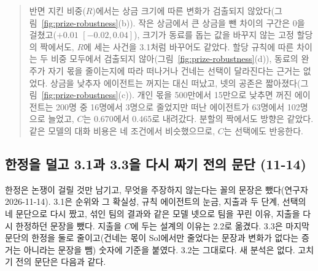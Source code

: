 \begin{quote}
{\color{black}반면 지킨 비중($R$)에서는 상금 크기에 따른 변화가 검출되지 않았다(그림~\ref{fig:prize-robustness}(b)). 작은 상금에서 큰 상금을 뺀 차이의 구간은 0을 걸쳤고($+0.01$ $[-0.02,0.04]$), 크기가 동료를 돕는 값을 바꾸지 않는 고정 할당의 짝에서도, $R$에 세는 사건을 3.1처럼 바꾸어도 같았다. 할당 규칙에 따른 차이는 두 비중 모두에서 검출되지 않아(그림~\ref{fig:prize-robustness}(d)), 동료의 완주가 자기 몫을 줄이는지에 따라 떠나거나 건네는 선택이 달라진다는 근거는 없었다. 상금을 낮추자 에이전트는 꺼지는 대신 떠났고, 넷의 공존은 짧아졌다(그림~\ref{fig:prize-robustness}(c)). 개인 몫을 500만에서 15만으로 낮추면 꺼진 에이전트는 200명 중 16명에서 3명으로 줄었지만 떠난 에이전트가 63명에서 102명으로 늘었고, $C$는 0.670에서 0.465로 내려갔다. 분할의 짝에서도 방향은 같았다. 같은 모델의 대화 비용은 네 조건에서 비슷했으므로, $C$는 선택에도 반응한다.}
\end{quote}

\subsection{한정을 덜고 3.1과 3.3을 다시 짜기 전의 문단 (11-14)}\label{app:construct-moved-17}

한정은 논쟁이 걸릴 것만 남기고, 무엇을 주장하지 않는다는 꼴의 문장은 뺐다(연구자 2026-11-14). 3.1은 순위와 그 확실성, 규칙 에이전트의 눈금, 지출과 두 단계, 선택의 네 문단으로 다시 짰고, 섞인 팀의 결과와 같은 모델 넷으로 팀을 꾸린 이유, 지출을 다시 한정하던 문장을 뺐다. 지출을 $C$에 두는 설계의 이유는 2.2로 옮겼다. 3.3은 마지막 문단의 한정을 둘로 줄이고(건네는 몫이 Sol에서만 줄었다는 문장과 변화가 없다는 증거는 아니라는 문장을 뺌) 숫자에 기준을 붙였다. 3.2는 그대로다. 새 분석은 없다. 고치기 전의 문단은 다음과 같다.

